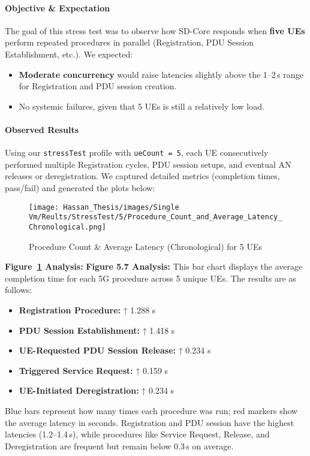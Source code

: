 \paragraph{Objective \& Expectation}
The goal of this stress test was to observe how SD-Core responds when \textbf{five UEs} perform repeated procedures in parallel (Registration, PDU Session Establishment, etc.). We expected:
\begin{itemize}
  \item \textbf{Moderate concurrency} would raise latencies slightly above the 1--2\,s range for Registration and PDU session creation.
  \item No systemic failures, given that 5 UEs is still a relatively low load.
\end{itemize}

\paragraph{Observed Results}
Using our \texttt{stressTest} profile with \texttt{ueCount = 5}, each UE consecutively performed multiple Registration cycles, PDU session setups, and eventual AN releases or deregistration. We captured detailed metrics (completion times, pass/fail) and generated the plots below:

\begin{figure}[H]
    \centering
    \texttt{[image: Hassan\_Thesis/images/Single Vm/Reults/StressTest/5/Procedure\_Count\_and\_Average\_Latency\_Chronological.png]}
    \caption{Procedure Count \& Average Latency (Chronological) for 5 UEs}
    \label{fig:5ue-count-latency}
\end{figure}

\noindent
\textbf{Figure~\ref{fig:5ue-count-latency} Analysis:}  
\textbf{Figure 5.7 Analysis:} This bar chart displays the average completion time for each 5G procedure across 5 unique UEs. The results are as follows:
\begin{itemize}
    \item \textbf{Registration Procedure:} ↑ 1.288 s
    \item \textbf{PDU Session Establishment:} ↑ 1.418 s
    \item \textbf{UE-Requested PDU Session Release:} ↑ 0.234 s
    \item \textbf{Triggered Service Request:} ↑ 0.159 s
    \item \textbf{UE-Initiated Deregistration:} ↑ 0.234 s
\end{itemize}
Blue bars represent how many times each procedure was run; red markers show the average latency in seconds. Registration and PDU session have the highest latencies (1.2--1.4\,s), while procedures like Service Request, Release, and Deregistration are frequent but remain below 0.3\,s on average.

